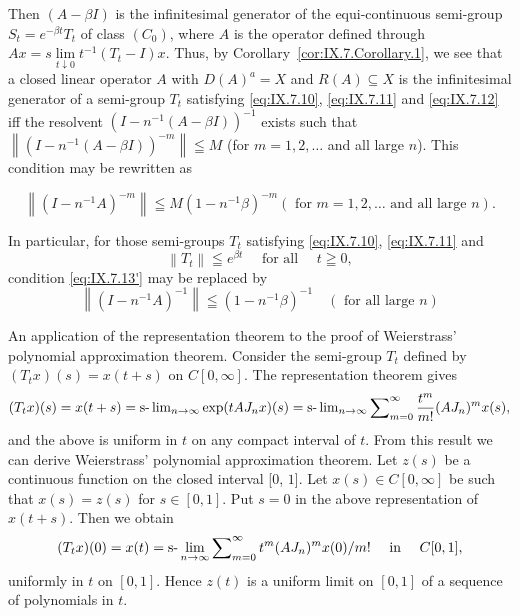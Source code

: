 Then $(A - \beta I)$ is the infinitesimal generator of the equi-continuous semi-group $S_{t} = e^{-\beta t}T_{t}$ of class $(C_0)$, where $A$ is the operator defined through $Ax = s\lim\limits_{t\downarrow 0}t^{-1}(T_t - I)x$. Thus, by Corollary~\ref{cor:IX.7.Corollary.1}, we see that a closed linear operator $A$ with $D(A)^{a} = X$ and $R(A)\subseteq X$ is the infinitesimal generator of a semi-group $T_{t}$ satisfying \eqref{eq:IX.7.10}, \eqref{eq:IX.7.11} and \eqref{eq:IX.7.12} iff the resolvent $(I - n^{-1}(A - \beta I))^{-1}$ exists such that 
$\left\|(I-n^{-1}(A-\beta I))^{-m}\right\|\leqq M$ (for $m=1,2,\ldots$ and all large $n$). This condition may be rewritten as 

\begin{equation}\tag{13'}\label{eq:IX.7.13'}
\left\| (I - n ^{-1} A) ^{-m} \right\| \leqq M (1 - n ^{-1} \beta) ^{-m} (\text{ for } m = 1, 2, \dots \text{ and all large } n).
\end{equation}

In particular, for those semi-groups $T_{t}$ satisfying \eqref{eq:IX.7.10}, \eqref{eq:IX.7.11} and 
\begin{equation}\label{eq:IX.7.14}
\left\| T _{t} \right\| \leqq e ^{\beta t} \quad \text{ for all } \quad t \geqq 0,
\end{equation}
condition \eqref{eq:IX.7.13'} may be replaced by 
\begin{equation}\tag{13''}\label{eq:IX.7.13}
\left\| (I - n ^{-1} A) ^{-1} \right\| \leqq (1 - n ^{-1} \beta) ^{-1} \quad (\text{ for all large } n)
\end{equation}

An application of the representation theorem to the proof of Weierstrass' polynomial approximation theorem. Consider the semi-group $T_{t}$ defined by $(T_{t}x)(s) = x(t + s)$ on $C[0,\infty]$. The representation theorem gives 
\[
(T _{t} x) (s) = x (t + s) = \text{s-}\lim\nolimits_{n \rightarrow \infty} \exp (t A J _{n} x) (s) = \text{s-}\lim\nolimits_{n \rightarrow \infty} \sum\nolimits_{m=0} ^{\infty} \frac {t ^{m}}{m !} (A J _{n}) ^{m} x (s),
\]
and the above \slim is uniform in $t$ on any compact interval of $t$. From this result we can derive Weierstrass' polynomial approximation theorem. Let $z(s)$ be a continuous function on the closed interval [$0$, $1$]. Let $x(s) \in C[0, \infty]$ be such that $x(s) = z(s)$ for $s \in [0, 1]$. Put $s = 0$ in the above representation of $x(t + s)$. Then we obtain 
\[
(T _{t} x) (0) = x (t) = \text{s-}\lim _{n \to \infty} \sum\nolimits_{m=0} ^{\infty} t ^{m} (A J _{n}) ^{m} x (0) / m! \quad \text{ in } \quad C [ 0, 1 ],
\]
uniformly in $t$ on $[0, 1]$. Hence $z(t)$ is a uniform limit on $[0, 1]$ of a sequence of polynomials in $t$. 


